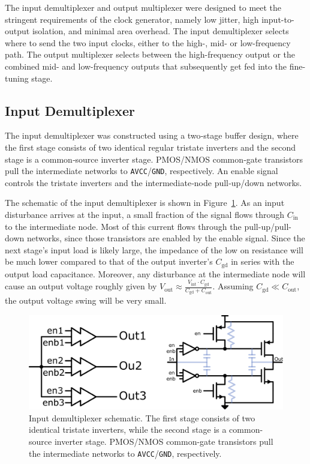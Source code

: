The input demultiplexer and output multiplexer were designed to meet the stringent requirements of the clock generator, namely low jitter, high input-to-output isolation, and minimal area overhead. The input demultiplexer selects where to send the two input clocks, either to the high-, mid- or low-frequency path. The output multiplexer selects between the high-frequency output or the combined mid- and low-frequency outputs that subsequently get fed into the fine-tuning stage.

\subsection{Input Demultiplexer}

The input demultiplexer was constructed using a two‑stage buffer design, where the first stage consists of two identical regular tristate inverters and the second stage is a common‑source inverter stage. PMOS/NMOS common‑gate transistors pull the intermediate networks to \texttt{AVCC}/\texttt{GND}, respectively. An enable signal controls the tristate inverters and the intermediate‑node pull‑up/down networks.

The schematic of the input demultiplexer is shown in Figure~\ref{fig:input_demux}. As an input disturbance arrives at the input, a small fraction of the signal flows through \(C_{\text{in}}\) to the intermediate node. Most of this current flows through the pull-up/pull-down networks, since those transistors are enabled by the enable signal. Since the next stage's input load is likely large, the impedance of the low on resistance will be much lower compared to that of the output inverter's \(C_{\text{gd}}\) in series with the output load capacitance. Moreover, any disturbance at the intermediate node will cause an output voltage roughly given by \(V_{\text{out}} \approx \frac{V_{\text{int}}\cdot C_{\text{gd}}}{C_{\text{gd}} + C_{\text{out}}}\). Assuming \(C_{\text{gd}} \ll C_{\text{out}}\), the output voltage swing will be very small.

\begin{figure}[H]
  \centering
  \includegraphics[width=0.8\linewidth]{figures/Schematics/input_demux.png}
  \caption{Input demultiplexer schematic. The first stage consists of two identical tristate inverters, while the second stage is a common-source inverter stage. PMOS/NMOS common-gate transistors pull the intermediate networks to \texttt{AVCC}/\texttt{GND}, respectively.}
  \label{fig:input_demux}
\end{figure}

